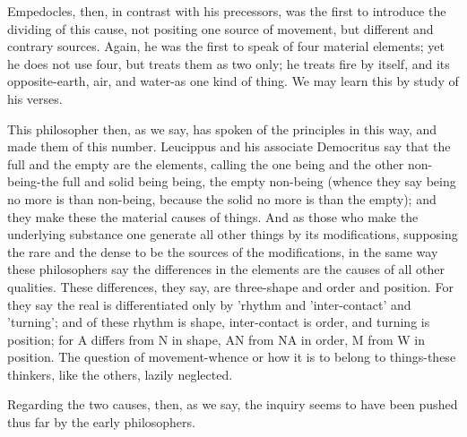 \documentclass{article}
\begin{document}
Empedocles, then, in contrast with his precessors, was the first to introduce the dividing of this cause, not positing one source of movement, but different and contrary sources. Again, he was the first to speak of four material elements; yet he does not use four, but treats them as two only; he treats fire by itself, and its opposite-earth, air, and water-as one kind of thing. We may learn this by study of his verses.

This philosopher then, as we say, has spoken of the principles in this way, and made them of this number. Leucippus and his associate Democritus say that the full and the empty are the elements, calling the one being and the other non-being-the full and solid being being, the empty non-being (whence they say being no more is than non-being, because the solid no more is than the empty); and they make these the material causes of things. And as those who make the underlying substance one generate all other things by its modifications, supposing the rare and the dense to be the sources of the modifications, in the same way these philosophers say the differences in the elements are the causes of all other qualities. These differences, they say, are three-shape and order and position. For they say the real is differentiated only by 'rhythm and 'inter-contact' and 'turning'; and of these rhythm is shape, inter-contact is order, and turning is position; for A differs from N in shape, AN from NA in order, M from W in position. The question of movement-whence or how it is to belong to things-these thinkers, like the others, lazily neglected.

Regarding the two causes, then, as we say, the inquiry seems to have been pushed thus far by the early philosophers.
\end{document}
